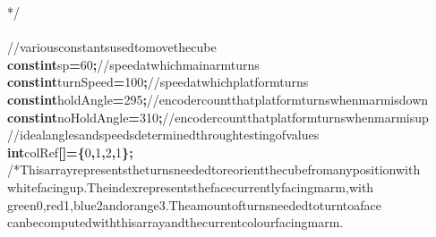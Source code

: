 \documentclass[a4paper, 10pt]{article}
\newcommand\SPC{\hspace*{0.6em}}
\newcommand\HYP{\mbox{\char 45}}
\newcommand{\CppAComment}[1]{\textcolor[rgb]{0,0.5,0}{\colorbox[rgb]{1,1,1}{#1}}}
\newcommand{\CppAIdentifier}[1]{#1}
\newcommand{\CppANumber}[1]{\textcolor[rgb]{0,0,1}{\colorbox[rgb]{1,1,1}{#1}}}
\newcommand{\CppAReservedWord}[1]{\textbf{\colorbox[rgb]{1,1,1}{#1}}}
\newcommand{\CppASpace}[1]{\colorbox[rgb]{1,1,1}{#1}}
\newcommand{\CppASymbol}[1]{\textbf{\textcolor[rgb]{1,0,0}{\colorbox[rgb]{1,1,1}{#1}}}}
\begin{document}
\begin{ttfamily}
\CppAComment{*/}\\
\\
\CppAComment{//\SPC various\SPC constants\SPC used\SPC to\SPC move\SPC the\SPC cube}\\
\CppAReservedWord{const}\CppASpace{\SPC }\CppAReservedWord{int}\CppASpace{\SPC }\CppAIdentifier{sp}\CppASpace{\SPC }\CppASymbol{=}\CppANumber{60}\CppASymbol{;}\CppASpace{\SPC }\CppAComment{//\SPC speed\SPC at\SPC which\SPC main\SPC arm\SPC turns}\\
\CppAReservedWord{const}\CppASpace{\SPC }\CppAReservedWord{int}\CppASpace{\SPC }\CppAIdentifier{turnSpeed}\CppASymbol{=}\CppANumber{100}\CppASymbol{;}\CppASpace{\SPC }\CppAComment{//\SPC speed\SPC at\SPC which\SPC platform\SPC turns}\\
\CppAReservedWord{const}\CppASpace{\SPC }\CppAReservedWord{int}\CppASpace{\SPC }\CppAIdentifier{holdAngle}\CppASymbol{=}\CppANumber{295}\CppASymbol{;}\CppASpace{\SPC }\CppAComment{//\SPC encoder\SPC count\SPC that\SPC platform\SPC turns\SPC when\SPC marm\SPC is\SPC down}\\
\CppAReservedWord{const}\CppASpace{\SPC }\CppAReservedWord{int}\CppASpace{\SPC }\CppAIdentifier{noHoldAngle}\CppASymbol{=}\CppANumber{310}\CppASymbol{;}\CppASpace{\SPC }\CppAComment{//\SPC encoder\SPC count\SPC that\SPC platform\SPC turns\SPC when\SPC marm\SPC is\SPC up}\\
\CppAComment{//\SPC ideal\SPC angles\SPC and\SPC speeds\SPC determined\SPC through\SPC testing\SPC of\SPC values}\\
\CppAReservedWord{int}\CppASpace{\SPC }\CppAIdentifier{colRef}\CppASymbol{[}\CppASymbol{]}\CppASpace{\SPC }\CppASymbol{=}\CppASpace{\SPC }\CppASymbol{\{}\CppANumber{0}\CppASymbol{,}\CppASpace{\SPC }\CppANumber{1}\CppASymbol{,}\CppASpace{\SPC }\CppANumber{2}\CppASymbol{,}\CppASpace{\SPC }\CppASymbol{\HYP }\CppANumber{1}\CppASymbol{\}}\CppASymbol{;}\CppASpace{\SPC }\\
\CppAComment{/*\SPC This\SPC array\SPC represents\SPC the\SPC turns\SPC needed\SPC to\SPC reorient\SPC the\SPC cube\SPC from\SPC any\SPC position\SPC with}\\
\CppAComment{white\SPC facing\SPC up.\SPC The\SPC index\SPC represents\SPC the\SPC face\SPC currently\SPC facing\SPC marm,\SPC with\SPC }\\
\CppAComment{green\SPC 0,\SPC red\SPC 1,\SPC blue\SPC 2\SPC and\SPC orange\SPC 3.\SPC The\SPC amount\SPC of\SPC turns\SPC needed\SPC to\SPC turn\SPC to\SPC a\SPC face}\\
\CppAComment{can\SPC be\SPC computed\SPC with\SPC this\SPC array\SPC and\SPC the\SPC current\SPC colour\SPC facing\SPC marm.}\\

\end{ttfamily}
\end{document}
